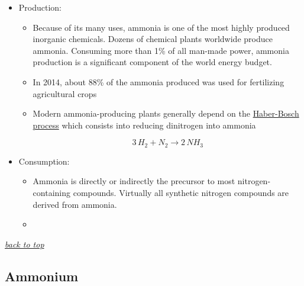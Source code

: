 \documentclass[]{book}
\providecommand{\tightlist}{%
  \setlength{\itemsep}{0pt}\setlength{\parskip}{0pt}}
\theoremstyle{definition}
\theoremstyle{definition}
\theoremstyle{definition}
\theoremstyle{remark}
\begin{document}
\begin{itemize}
\tightlist
\item
  Production:

  \begin{itemize}
  \item
    Because of its many uses, ammonia is one of the most highly produced
    inorganic chemicals. Dozens of chemical plants worldwide produce
    ammonia. Consuming more than 1\% of all man-made power, ammonia
    production is a significant component of the world energy budget.
  \item
    In 2014, about 88\% of the ammonia produced was used for fertilizing
    agricultural crops
  \item
    Modern ammonia-producing plants generally depend on the
    \protect\hyperlink{haber-bosch}{Haber-Bosch process} which consists
    into reducing dinitrogen into ammonia

    \[
    3\,H_2 + N_2 \to 2\,NH_3
    \]
  \end{itemize}
\item
  Consumption:

  \begin{itemize}
  \item
    Ammonia is directly or indirectly the precursor to most
    nitrogen-containing compounds. Virtually all synthetic nitrogen
    compounds are derived from ammonia.
  \item
  \end{itemize}
\end{itemize}

\emph{\protect\hyperlink{top}{back to top}}

\subsection{Ammonium}\label{ammonium}
\end{document}
